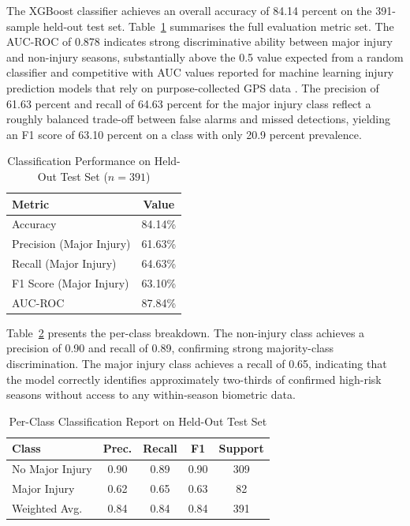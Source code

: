 \documentclass[conference]{IEEEtran}
\begin{document}
The XGBoost classifier achieves an overall accuracy of 84.14 percent on the 391-sample held-out test set. Table~\ref{tab:performance} summarises the full evaluation metric set. The AUC-ROC of 0.878 indicates strong discriminative ability between major injury and non-injury seasons, substantially above the 0.5 value expected from a random classifier and competitive with AUC values reported for machine learning injury prediction models that rely on purpose-collected GPS data \cite{rossi2018effective, carey2018predictive}. The precision of 61.63 percent and recall of 64.63 percent for the major injury class reflect a roughly balanced trade-off between false alarms and missed detections, yielding an F1 score of 63.10 percent on a class with only 20.9 percent prevalence.

\begin{table}[ht]
\centering
\caption{Classification Performance on Held-Out Test Set ($n = 391$)}
\label{tab:performance}
\renewcommand{\arraystretch}{1.15}
\begin{tabular}{|l|c|}
\hline
\textbf{Metric} & \textbf{Value} \\
\hline
Accuracy & 84.14\% \\
\hline
Precision (Major Injury) & 61.63\% \\
\hline
Recall (Major Injury) & 64.63\% \\
\hline
F1 Score (Major Injury) & 63.10\% \\
\hline
AUC-ROC & 87.84\% \\
\hline
\end{tabular}
\end{table}

Table~\ref{tab:classreport} presents the per-class breakdown. The non-injury class achieves a precision of 0.90 and recall of 0.89, confirming strong majority-class discrimination. The major injury class achieves a recall of 0.65, indicating that the model correctly identifies approximately two-thirds of confirmed high-risk seasons without access to any within-season biometric data.

\begin{table}[ht]
\centering
\caption{Per-Class Classification Report on Held-Out Test Set}
\label{tab:classreport}
\renewcommand{\arraystretch}{1.15}
\begin{tabular}{|l|c|c|c|c|}
\hline
\textbf{Class} & \textbf{Prec.} & \textbf{Recall} & \textbf{F1} & \textbf{Support} \\
\hline
No Major Injury & 0.90 & 0.89 & 0.90 & 309 \\
\hline
Major Injury & 0.62 & 0.65 & 0.63 & 82 \\
\hline
Weighted Avg. & 0.84 & 0.84 & 0.84 & 391 \\
\hline
\end{tabular}
\end{table}
\end{document}

